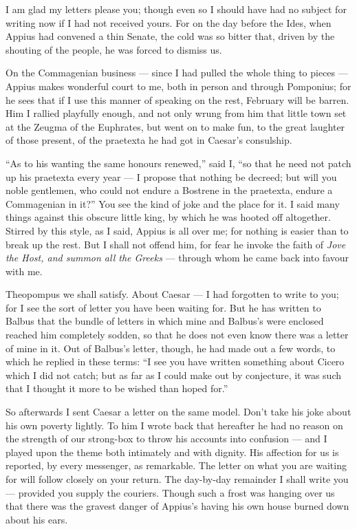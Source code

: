 

 I am glad my letters please you; though even so I should have had no subject for writing now if I had not received yours. For on the day before the Ides, when Appius had convened a thin Senate, the cold was so bitter that, driven by the shouting of the people, he was forced to dismiss us.

 On the Commagenian business --- since I had pulled the whole thing to pieces --- Appius makes wonderful court to me, both in person and through Pomponius; for he sees that if I use this manner of speaking on the rest, February will be barren. Him I rallied playfully enough, and not only wrung from him that little town set at the Zeugma of the Euphrates, but went on to make fun, to the great laughter of those present, of the praetexta he had got in Caesar's consulship.

 ``As to his wanting the same honours renewed,'' said I, ``so that he need not patch up his praetexta every year --- I propose that nothing be decreed; but will you noble gentlemen, who could not endure a Bostrene in the praetexta, endure a Commagenian in it?'' You see the kind of joke and the place for it. I said many things against this obscure little king, by which he was hooted off altogether. Stirred by this style, as I said, Appius is all over me; for nothing is easier than to break up the rest. But I shall not offend him, for fear he invoke the faith of \textit{Jove the Host, and summon all the Greeks} --- through whom he came back into favour with me.

 Theopompus we shall satisfy. About Caesar --- I had forgotten to write to you; for I see the sort of letter you have been waiting for. But he has written to Balbus that the bundle of letters in which mine and Balbus's were enclosed reached him completely sodden, so that he does not even know there was a letter of mine in it. Out of Balbus's letter, though, he had made out a few words, to which he replied in these terms: ``I see you have written something about Cicero which I did not catch; but as far as I could make out by conjecture, it was such that I thought it more to be wished than hoped for.''

 So afterwards I sent Caesar a letter on the same model. Don't take his joke about his own poverty lightly. To him I wrote back that hereafter he had no reason on the strength of our strong-box to throw his accounts into confusion --- and I played upon the theme both intimately and with dignity. His affection for us is reported, by every messenger, as remarkable. The letter on what you are waiting for will follow closely on your return. The day-by-day remainder I shall write you --- provided you supply the couriers. Though such a frost was hanging over us that there was the gravest danger of Appius's having his own house burned down about his ears.
